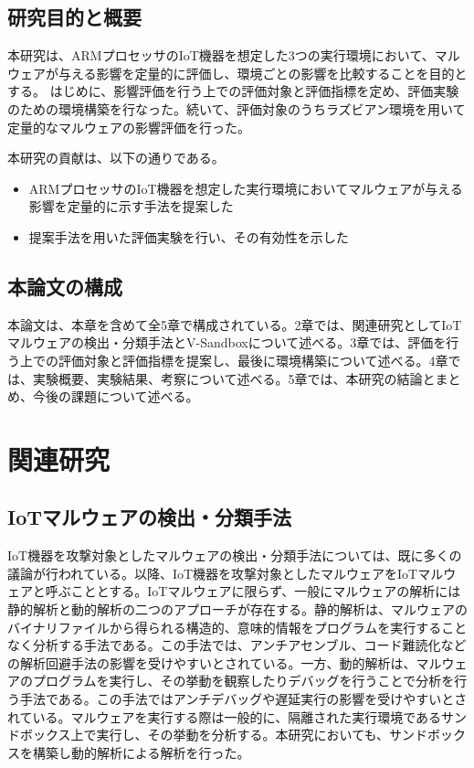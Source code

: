 \documentclass[12pt,a4paper,titlepage,report]{jsbook}
\begin{document}
\section{研究目的と概要}
本研究は、ARMプロセッサのIoT機器を想定した3つの実行環境において、マルウェアが与える影響を定量的に評価し、環境ごとの影響を比較することを目的とする。
はじめに、影響評価を行う上での評価対象と評価指標を定め、評価実験のための環境構築を行なった。続いて、評価対象のうちラズビアン環境を用いて定量的なマルウェアの影響評価を行った。


本研究の貢献は、以下の通りである。
\begin{itemize}
    \item ARMプロセッサのIoT機器を想定した実行環境においてマルウェアが与える影響を定量的に示す手法を提案した
    \item 提案手法を用いた評価実験を行い、その有効性を示した
\end{itemize}

\section{本論文の構成}
本論文は、本章を含めて全5章で構成されている。2章では、関連研究としてIoTマルウェアの検出・分類手法とV-Sandboxについて述べる。3章では、評価を行う上での評価対象と評価指標を提案し、最後に環境構築について述べる。4章では、実験概要、実験結果、考察について述べる。5章では、本研究の結論とまとめ、今後の課題について述べる。




\chapter{関連研究}
\section{IoTマルウェアの検出・分類手法}
IoT機器を攻撃対象としたマルウェアの検出・分類手法については、既に多くの議論が行われている。以降、IoT機器を攻撃対象としたマルウェアをIoTマルウェアと呼ぶこととする。IoTマルウェアに限らず、一般にマルウェアの解析には静的解析と動的解析の二つのアプローチが存在する\cite{malwaresurvey}。静的解析は、マルウェアのバイナリファイルから得られる構造的、意味的情報をプログラムを実行することなく分析する手法である。この手法では、アンチアセンブル、コード難読化などの解析回避手法の影響を受けやすいとされている。一方、動的解析は、マルウェアのプログラムを実行し、その挙動を観察したりデバッグを行うことで分析を行う手法である。この手法ではアンチデバッグや遅延実行の影響を受けやすいとされている。マルウェアを実行する際は一般的に、隔離された実行環境であるサンドボックス上で実行し、その挙動を分析する。本研究においても、サンドボックスを構築し動的解析による解析を行った。
\end{document}
